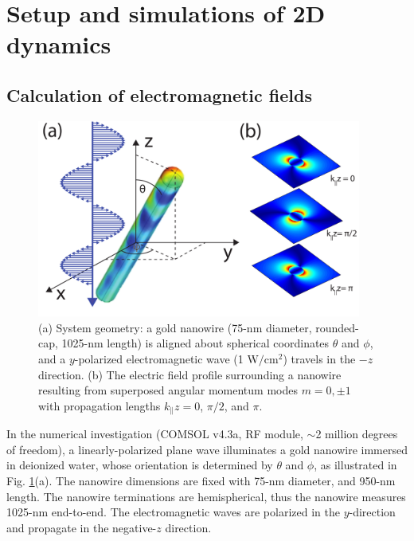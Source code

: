 \section{Setup and simulations of 2D dynamics}\label{intro}
\subsection{Calculation of electromagnetic fields}
\begin{figure}[ht]
\centering\includegraphics[width=0.95\textwidth]{SetupPicMatt.pdf}
\caption{(a) System geometry: a gold nanowire (75-nm diameter, rounded-cap, 1025-nm length) is aligned about spherical coordinates $\theta$ and $\phi$, and a $y$-polarized electromagnetic wave (1 W$/$cm$^2$) travels in the $-z$ direction. (b) The electric field profile surrounding a nanowire resulting from superposed angular momentum modes $m=0,\pm1$ with propagation lengths
$k_{\parallel}z = 0$, $\pi/2$, and $\pi$.\label{setup}}
\end{figure}

In the numerical investigation (COMSOL v4.3a, RF module, $\sim$2 million degrees of freedom), a linearly-polarized plane wave illuminates a gold nanowire immersed in deionized water, whose orientation is determined by $\theta$ and $\phi$, as illustrated in Fig. \ref{setup}(a). The nanowire dimensions are fixed with 75-nm diameter, and 950-nm length.  The nanowire terminations are hemispherical, thus the nanowire measures 1025-nm end-to-end.
 The electromagnetic waves are polarized in the $y$-direction and propagate in the negative-$z$ direction.

